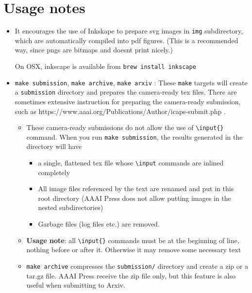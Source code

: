 \section{Usage notes}
\label{sec:usage}
\begin{itemize}
\item
  It encourages the use of Inkskape to
  prepare svg images in \texttt{img} subdirectory, which are
  automatically compiled into pdf figures. (This is a recommended way,
  since pngs are bitmaps and doesnt print nicely.)

  On OSX, inkscape is available from \texttt{brew\ install\ inkscape}
\item
  \texttt{make\ submission}, \texttt{make\ archive},
  \texttt{make\ arxiv} : These \texttt{make} targets will create a
  \texttt{submission} directory and prepares the camera-ready tex files.
  There are sometimes extensive instruction for preparing the
  camera-ready submission, such as
  https://www.aaai.org/Publications/Author/icaps-submit.php .

  \begin{itemize}
  
  \item
    These camera-ready submissions do not allow the use of
    \texttt{\textbackslash{}input\{\}} command. When you run
    \texttt{make\ submission}, the results generated in the directory
    will have

    \begin{itemize}
    
    \item
      a single, flattened tex file whose \texttt{\textbackslash{}input}
      commands are inlined completely
    \item
      All image files referenced by the text are renamed and put in this
      root directory (AAAI Press does not allow putting images in the
      nested subdirectories)
    \item
      Garbage files (log files etc.) are removed.
    \end{itemize}
  \item
    \textbf{Usage note}: all \texttt{\textbackslash{}input\{\}} commands
    must be at the beginning of line, nothing before or after it.
    Otherwise it may remove some necessary text
  \item
    \texttt{make\ archive} compresses the \texttt{submission/} directory
    and create a zip or a tar.gz file. AAAI Press receive the zip file
    only, but this feature is also useful when submitting to Arxiv.


\end{itemize}
\end{itemize}
